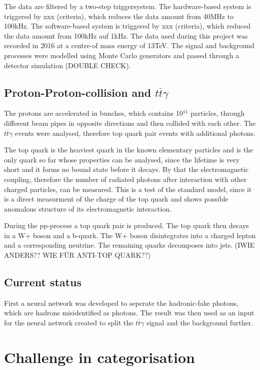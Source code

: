 \documentclass[11pt]{scrartcl}
\begin{document}
	The data are filtered by a two-step triggersystem. The hardware-based system is triggered by xxx (criteria), which reduces the data amount from 40MHz to 100kHz. The software-based system is triggered by xxx (criteria), which reduced the data amount from 100kHz auf 1kHz.  The data used during this project was recorded in 2016 at a centre-of mass energy of 13TeV. The signal and background processes were modelled using Monte Carlo generators and passed through a detector simulation (DOUBLE CHECK). 

	\subsection{Proton-Proton-collision and $t\overline{t}\gamma$}
	The protons are accelerated in bunches, which contains 10$^{11}$ particles, through different beam pipes in opposite directions and then collided with each other. The $t\overline{t}\gamma$ events were analysed, therefore top quark pair events with additional photons.
	
	The top quark is the heaviest quark in the known elementary particles and is the only quark so far whose properties can be analysed, since the lifetime is very short and it forms no bound state before it decays. By that the electromagnetic coupling, therefore the number of radiated photons after interaction with other charged particles, can be measured. This is a test of the standard model, since it is a direct measurment of the charge of the top quark and shows possible anomalous structure of its electromagnetic interaction.
	
	During the pp-process a top quark pair is produced. The top quark then decays in a W+ boson and a b-quark. The W+ boson disintegrates into a charged lepton and a corresponding neutrine. The remaining quarks decomposes into jets. (IWIE ANDERS?? WIE FÜR ANTI-TOP QUARK??)

	\subsection{Current status}
	
	First a neural network was developed to seperate the hadronic-fake photons, which are hadrons misidentified as photons. The result was then used as an input for the neural network created to split the $t\overline{t}\gamma$ signal and the background further. 

\section{Challenge in categorisation}
\end{document}
